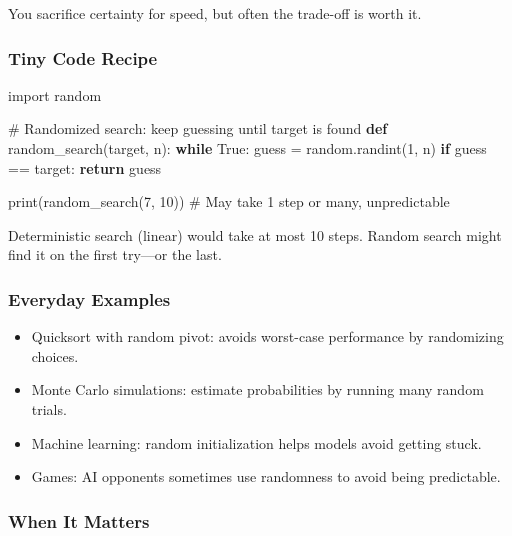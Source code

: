 \documentclass[
  letterpaper,
  DIV=11,
  numbers=noendperiod]{scrreprt}
\newenvironment{Shaded}{\begin{snugshade}}{\end{snugshade}}
\newcommand{\BuiltInTok}[1]{\textcolor[rgb]{0.00,0.23,0.31}{#1}}
\newcommand{\CommentTok}[1]{\textcolor[rgb]{0.37,0.37,0.37}{#1}}
\newcommand{\ControlFlowTok}[1]{\textcolor[rgb]{0.00,0.23,0.31}{\textbf{#1}}}
\newcommand{\DecValTok}[1]{\textcolor[rgb]{0.68,0.00,0.00}{#1}}
\newcommand{\ImportTok}[1]{\textcolor[rgb]{0.00,0.46,0.62}{#1}}
\newcommand{\KeywordTok}[1]{\textcolor[rgb]{0.00,0.23,0.31}{\textbf{#1}}}
\newcommand{\NormalTok}[1]{\textcolor[rgb]{0.00,0.23,0.31}{#1}}
\newcommand{\OperatorTok}[1]{\textcolor[rgb]{0.37,0.37,0.37}{#1}}
\newcommand{\VariableTok}[1]{\textcolor[rgb]{0.07,0.07,0.07}{#1}}
\providecommand{\tightlist}{%
  \setlength{\itemsep}{0pt}\setlength{\parskip}{0pt}}
\begin{document}
You sacrifice certainty for speed, but often the trade-off is worth it.

\subsubsection{Tiny Code Recipe}\label{tiny-code-recipe-27}

\begin{Shaded}
\begin{Highlighting}[]
\ImportTok{import}\NormalTok{ random}

\CommentTok{\# Randomized search: keep guessing until target is found}
\KeywordTok{def}\NormalTok{ random\_search(target, n):}
    \ControlFlowTok{while} \VariableTok{True}\NormalTok{:}
\NormalTok{        guess }\OperatorTok{=}\NormalTok{ random.randint(}\DecValTok{1}\NormalTok{, n)}
        \ControlFlowTok{if}\NormalTok{ guess }\OperatorTok{==}\NormalTok{ target:}
            \ControlFlowTok{return}\NormalTok{ guess}

\BuiltInTok{print}\NormalTok{(random\_search(}\DecValTok{7}\NormalTok{, }\DecValTok{10}\NormalTok{))  }\CommentTok{\# May take 1 step or many, unpredictable}
\end{Highlighting}
\end{Shaded}

Deterministic search (linear) would take at most 10 steps. Random search
might find it on the first try---or the last.

\subsubsection{Everyday Examples}\label{everyday-examples-28}

\begin{itemize}
\tightlist
\item
  Quicksort with random pivot: avoids worst-case performance by
  randomizing choices.
\item
  Monte Carlo simulations: estimate probabilities by running many random
  trials.
\item
  Machine learning: random initialization helps models avoid getting
  stuck.
\item
  Games: AI opponents sometimes use randomness to avoid being
  predictable.
\end{itemize}

\subsubsection{When It Matters}\label{when-it-matters-27}
\end{document}
